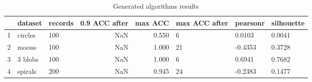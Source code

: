 \begin{table}[H]
\footnotesize
\centering
\caption{Generated algorithms results}
\label{tab:generated}
\begin{tabular}{lllrrlll}
\hline
{} &  dataset & records &  0.9 ACC after &  max ACC & max ACC after & pearsonr & silhouette \\
\hline
1 &  circles &     100 &                 NaN &         0.550 &                  6 &   0.0103 &     0.0041 \\
2 &    moons &     100 &                 NaN &         1.000 &                 21 &  -0.4353 &     0.3728 \\
3 &  3 blobs &     100 &                 NaN &         1.000 &                  6 &   0.6941 &     0.7682 \\
4 &  spirals &     200 &                 NaN &         0.945 &                 24 &  -0.2383 &     0.1477 \\
\hline
\end{tabular}
\end{table}
